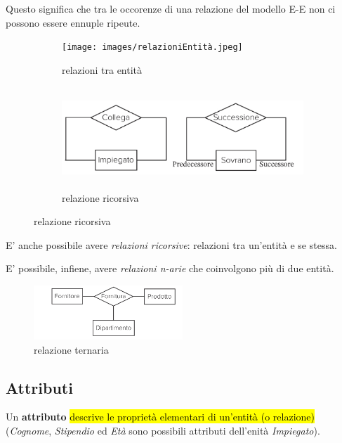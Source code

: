 \documentclass[a4paper, 12pt]{book}
\begin{document}
    Questo significa che tra le occorenze di una relazione del modello E-E non ci possono essere ennuple ripeute.

    \begin{figure}[h]
      \centering

      \begin{subfigure}[b]{0.45\textwidth}
        \centering
        \texttt{[image: images/relazioniEntità.jpeg]}
        \caption{relazioni tra entità}
      \end{subfigure}
      \hfill
      \begin{subfigure}[b]{0.45\textwidth}
        \centering
        \includegraphics[width=\textwidth, height=3.8cm]{images/relazioniRicorsive.jpeg}
        \caption{relazione ricorsiva}
     \end{subfigure}
    \end{figure}

    E' anche possibile avere \textit{relazioni ricorsive}: relazioni tra un'entità e se stessa.

    E' possibile, infiene, avere \textit{relazioni n-arie} che coinvolgono più di due entità.

    \begin{figure}[H]
      \centering
      \includegraphics[width=0.5\textwidth, keepaspectratio]{images/relazioneTernaria.jpeg}
      \caption{relazione ternaria}
    \end{figure}

    \subsection*{Attributi}
    Un \textbf{attributo} \hl{descrive le proprietà elementari di un'entità (o relazione)} (\textit{Cognome}, \textit{Stipendio} ed \textit{Età} sono possibili attributi dell'enità \textit{Impiegato}).
\end{document}
